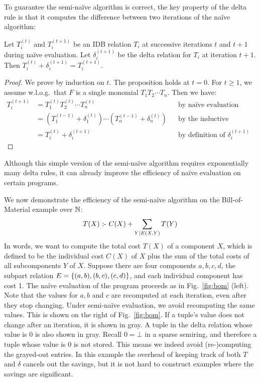 To guarantee the semi-na\"ive algorithm is correct,
the key property of the delta rule is that it computes the difference
 between two iterations of the na\"ive algorithm:
%
\begin{prop}
\label{thm:delta}
Let $T_i^{(t)}$ and $T_i^{(t+1)}$ be an IDB relation $T_i$ 
 at successive iterations $t$ and $t+1$ during na\"ive evaluation.
Let $\delta_i^{(t+1)}$ be the delta relation for $T_i$ at iteration $t+1$.
Then $T_i^{(t)} + \delta_i^{(t+1)} = T_i^{(t+1)}$.
\end{prop}
%
\begin{proof}
We prove by induction on $t$.
The proposition holds at $t=0$.
For $t\geq 1$, we assume w.l.o.g.\ that $F$ is a single monomial $T_1 T_2 \cdots T_n$.
Then we have:
\begin{align*}
T_i^{(t+1)} & = T_1^{(t)} T_2^{(t)} \cdots T_n^{(t)} && \text{by na\"ive evaluation} \\ 
 & = (T_1^{(t-1)} + \delta_1^{(t)}) \cdots (T_n^{(t-1)} + \delta_n^{(t)}) && \text{by the inductive hypothesis} \\
 & = T_i^{(t)} + \delta_i^{(t+1)} && \text{by definition of $\delta_i^{(t+1)}$}
\end{align*}
\end{proof}

Although this simple version of the semi-na\"ive algorithm requires exponentially
 many delta rules, it can already improve the efficiency of na\"ive evaluation
 on certain programs.

\begin{ex}
\label{ex:sn-datalogo}
We now demonstrate the efficiency of the semi-na\"ive algorithm on the Bill-of-Material example 
 over $\mathbb N$:
%
$$ T(X) \text{ :- } C(X) + \sum_{Y \mid E(X, Y)} T(Y) $$
%
In words, we want to compute the total cost $T(X)$ of a component $X$, 
 which is defined to be the individual cost $C(X)$ of $X$ 
 plus the sum of the total costs of all subcomponents $Y$ of $X$.
Suppose there are four components $a, b, c, d$, 
 the subpart relation $E = \{ (a, b), (b, c), (c, d)\}$, 
 and each individual component has cost 1.
The na\"ive evaluation of the program proceeds as in Fig.~\ref{fig:bom} (left).
Note that the values for $a, b$ and $c$ are recomputed at each iteration, 
 even after they stop changing.
Under semi-na\"ive evaluation, we avoid recomputing the same values.
This is shown on the right of Fig.~\ref{fig:bom}.
If a tuple's value does not change after an iteration, 
 it is shown in gray.
A tuple in the delta relation whose value is 0 is also shown in gray.
Recall $0 = \bot$ in a sparse semiring,
 and therefore a tuple whose value is 0 is not stored.
This means we indeed avoid (re-)computing the grayed-out entries.
In this example the overhead of keeping track of both $T$ 
 and $\delta$ cancels out the savings, 
 but it is not hard to construct examples where the savings are significant. 
\end{ex}

